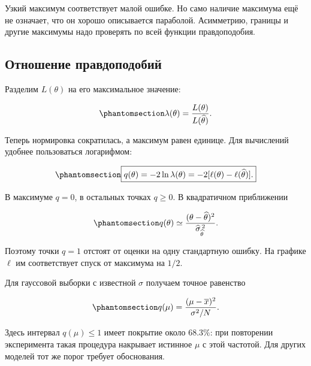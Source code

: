 \documentclass[
  russian,
  11pt,
  a4paper,
  open=any]{scrbook}
\begin{document}
Узкий максимум соответствует малой ошибке. Но само наличие максимума ещё
не означает, что он хорошо описывается параболой. Асимметрию, границы и
другие максимумы надо проверять по всей функции правдоподобия.

\subsection{Отношение
правдоподобий}\label{ux43eux442ux43dux43eux448ux435ux43dux438ux435-ux43fux440ux430ux432ux434ux43eux43fux43eux434ux43eux431ux438ux439}

Разделим \(L(\theta)\) на его максимальное значение:

\begin{equation}\protect\phantomsection\label{eq-ch10-relative-likelihood}{
\lambda(\theta)=\frac{L(\theta)}{L(\widehat\theta)}.
}\end{equation}

Теперь нормировка сократилась, а максимум равен единице. Для вычислений
удобнее пользоваться логарифмом:

\begin{equation}\protect\phantomsection\label{eq-likelihood-ratio-statistic}{
\boxed{
q(\theta)=-2\ln\lambda(\theta)
=-2[\ell(\theta)-\ell(\widehat\theta)].
}
}\end{equation}

В максимуме \(q=0\), в остальных точках \(q\geq0\). В квадратичном
приближении

\begin{equation}\protect\phantomsection\label{eq-ch10-quadratic-ratio}{
q(\theta)\simeq
\frac{(\theta-\widehat\theta)^2}
     {\widehat\sigma_{\widehat\theta}^{\,2}}.
}\end{equation}

Поэтому точки \(q=1\) отстоят от оценки на одну стандартную ошибку. На
графике \(\ell\) им соответствует спуск от максимума на \(1/2\).

Для гауссовой выборки с известной \(\sigma\) получаем точное равенство

\begin{equation}\protect\phantomsection\label{eq-ch10-gaussian-ratio}{
q(\mu)=\frac{(\mu-\overline x)^2}{\sigma^2/N}.
}\end{equation}

Здесь интервал \(q(\mu)\leq1\) имеет покрытие около \(68.3\%\): при
повторении эксперимента такая процедура накрывает истинное \(\mu\) с
этой частотой. Для других моделей тот же порог требует обоснования.
\end{document}
